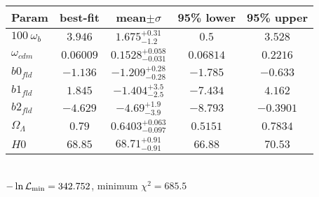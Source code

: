 \begin{tabular}{|l|c|c|c|c|} 
 \hline 
Param & best-fit & mean$\pm\sigma$ & 95\% lower & 95\% upper \\ \hline 
$100~\omega_{b }$ &$3.946$ & $1.675_{-1.2}^{+0.31}$ & $0.5$ & $3.528$ \\ 
$\omega_{cdm }$ &$0.06009$ & $0.1528_{-0.031}^{+0.058}$ & $0.06814$ & $0.2216$ \\ 
$b0_{fld }$ &$-1.136$ & $-1.209_{-0.28}^{+0.28}$ & $-1.785$ & $-0.633$ \\ 
$b1_{fld }$ &$1.845$ & $-1.404_{-2.5}^{+3.5}$ & $-7.434$ & $4.162$ \\ 
$b2_{fld }$ &$-4.629$ & $-4.69_{-3.9}^{+1.9}$ & $-8.793$ & $-0.3901$ \\ 
$\Omega_{\Lambda }$ &$0.79$ & $0.6403_{-0.097}^{+0.063}$ & $0.5151$ & $0.7834$ \\ 
$H0$ &$68.85$ & $68.71_{-0.91}^{+0.91}$ & $66.88$ & $70.53$ \\ 
\hline 
 \end{tabular} \\ 
$-\ln{\cal L}_\mathrm{min} =342.752$, minimum $\chi^2=685.5$ \\ 
